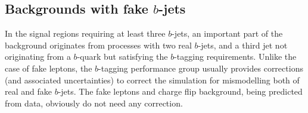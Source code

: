 


\subsection{Backgrounds with fake $b$-jets}
\label{sec:bkg_bjetfakes}

In the signal regions requiring at least three $b$-jets, an important part of the background originates from processes 
with two real $b$-jets, and a third jet not originating from a $b$-quark but satisfying the $b$-tagging requirements. 
Unlike the case of fake leptons, the $b$-tagging performance group usually provides corrections (and associated uncertainties) 
to correct the simulation for mismodelling both of real and fake $b$-jets. The fake leptons and charge flip background, being predicted from data, obviously do not need any correction. 

